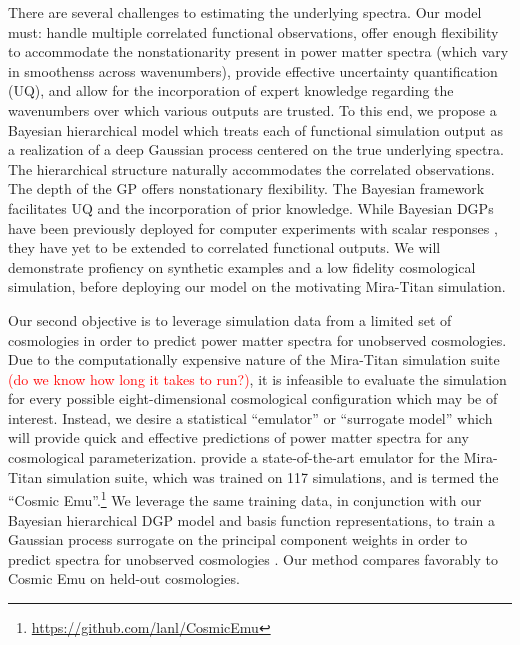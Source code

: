 \documentclass[11pt]{article}
\begin{document}
There are several challenges to estimating the underlying spectra.  Our model
must: handle multiple correlated functional observations, offer enough 
flexibility to accommodate the nonstationarity present in power matter spectra 
(which vary in smoothenss across wavenumbers), provide effective uncertainty
quantification (UQ), and allow for the incorporation of expert knowledge 
regarding the wavenumbers over which various outputs are trusted.  To this end, 
we propose a Bayesian hierarchical model which treats each of functional simulation 
output as a realization of a deep Gaussian process \citep[DGP;][]{damianou2013deep} 
centered on the true underlying spectra.  The hierarchical structure naturally
accommodates the correlated observations.  The depth of the GP offers nonstationary
flexibility.  The Bayesian framework facilitates UQ and the incorporation of prior
knowledge.  While Bayesian DGPs have been previously deployed for computer experiments 
with scalar responses \citep[e.g.,][]{sauer2023active,sauer2023vecchia,ming2023deep}, 
they have yet to be extended to correlated functional outputs. 
We will demonstrate profiency on synthetic examples and a low fidelity
cosmological simulation, before deploying our model on the motivating 
Mira-Titan simulation.

Our second objective is to leverage simulation data from a limited set of
cosmologies in order to predict power matter spectra for unobserved cosmologies.
Due to the computationally expensive nature of the Mira-Titan simulation suite
\textcolor{red}{(do we know how long it takes to run?)},
it is infeasible to evaluate the simulation for every possible eight-dimensional
cosmological configuration which may be of interest.  Instead, we desire
a statistical ``emulator'' or ``surrogate model'' 
\citep{santner2003design,gramacy2020surrogates} which will provide quick and effective
predictions of power matter spectra for any cosmological parameterization.
\citet{moran2023mira} provide a state-of-the-art emulator for the Mira-Titan
simulation suite, which was trained on 117 simulations, and is termed 
the ``Cosmic Emu''.\footnote{\url{https://github.com/lanl/CosmicEmu}}
We leverage the same training data, in conjunction with our Bayesian hierarchical
DGP model and basis function representations, to train a Gaussian process surrogate 
on the principal component weights in order to predict spectra for unobserved
cosmologies \citep{higdon2008computer, higdon2010estcosmo}. 
Our method compares favorably to Cosmic Emu on held-out cosmologies.
\end{document}
